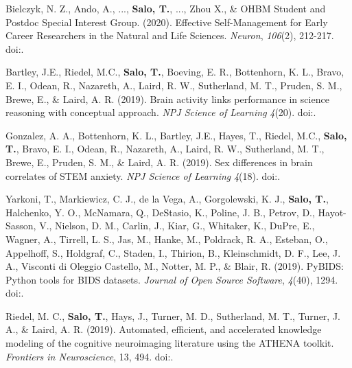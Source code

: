 \documentclass[10pt]{article}
\newcommand{\textlink}[3][blue]{\href{#2}{\color{#1}{#3}}}
\begin{document}
\begin{hangparas}{.25in}{1}
	\bigskip

	Bielczyk, N. Z., Ando, A., ..., \textbf{Salo, T.}, ..., Zhou X., \&
	OHBM Student and Postdoc Special Interest Group. (2020).
	Effective Self-Management for Early Career Researchers in the Natural and Life Sciences.
	\emph{Neuron}, \emph{106}(2), 212-217.
	doi:\textlink{https://doi.org/10.1016/j.neuron.2020.03.015}{10.1016/j.neuron.2020.03.015}.

	\bigskip

	Bartley, J.E., Riedel, M.C., \textbf{Salo, T.}, Boeving, E. R., Bottenhorn, K. L.,
	Bravo, E. I., Odean, R., Nazareth, A., Laird, R. W., Sutherland, M. T.,
	Pruden, S. M., Brewe, E., \& Laird, A. R. (2019).
	Brain activity links performance in science reasoning with conceptual approach.
	\emph{NPJ Science of Learning} \emph{4}(20).
	doi:\textlink{https://doi.org/10.1038/s41539-019-0059-8}{10.1038/s41539-019-0059-8}.

	\bigskip

	Gonzalez, A. A., Bottenhorn, K. L., Bartley, J.E., Hayes, T., Riedel, M.C.,
	\textbf{Salo, T.}, Bravo, E. I., Odean, R., Nazareth, A., Laird, R. W., Sutherland, M. T.,
	Brewe, E., Pruden, S. M., \& Laird, A. R. (2019).
	Sex differences in brain correlates of STEM anxiety.
	\emph{NPJ Science of Learning} \emph{4}(18).
	doi:\textlink{https://doi.org/10.1038/s41539-019-0058-9}{10.1038/s41539-019-0058-9}.

	\bigskip

	Yarkoni, T., Markiewicz, C. J., de la Vega, A., Gorgolewski, K. J.,
	\textbf{Salo, T.}, Halchenko, Y. O., McNamara, Q., DeStasio, K.,
	Poline, J. B., Petrov, D., Hayot-Sasson, V., Nielson, D. M., Carlin, J.,
	Kiar, G., Whitaker, K., DuPre, E., Wagner, A., Tirrell, L. S., Jas, M.,
	Hanke, M., Poldrack, R. A., Esteban, O., Appelhoff, S., Holdgraf, C.,
	Staden, I., Thirion, B., Kleinschmidt, D. F., Lee, J. A.,
	Visconti di Oleggio Castello, M., Notter, M. P., \& Blair, R. (2019).
	PyBIDS: Python tools for BIDS datasets.
	\emph{Journal of Open Source Software}, \emph{4}(40), 1294.
	doi:\textlink{https://doi.org/10.21105/joss.01294}{10.21105/joss.01294}.

	\bigskip

	Riedel, M. C., \textbf{Salo, T.}, Hays, J., Turner, M. D., Sutherland, M. T.,
	Turner, J. A., \& Laird, A. R. (2019).
	Automated, efficient, and accelerated knowledge modeling of the cognitive
	neuroimaging literature using the ATHENA toolkit.
	\emph{Frontiers in Neuroscience}, 13, 494.
	doi:\textlink{https://www.frontiersin.org/articles/10.3389/fnins.2019.00494/}{10.3389/fnins.2019.00494}.


\end{hangparas}
\end{document}
